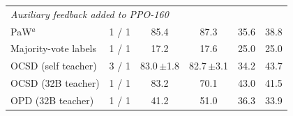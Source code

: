 \begin{tabular}{@{}l c c c c c@{}}
\midrule
\multicolumn{6}{l}{\emph{Auxiliary feedback added to PPO-160}} \\
PaW$^{a}$ & 1 / 1 & 85.4 & 87.3 & 35.6\rlap{\sigup{}} & 38.8\rlap{\sigup{}} \\
Majority-vote labels & 1 / 1 & 17.2\rlap{\sigup{}} & 17.6\rlap{\sigup{}} & 25.0\rlap{\sigup{}} & 25.0\rlap{\sigup{}} \\
OCSD (self teacher) & 3 / 1 & 83.0\sigup{}\,{\scriptsize$\pm$1.8} & 82.7\sigup{}\,{\scriptsize$\pm$3.1} & 34.2\rlap{\sigup{}} & 43.7\rlap{\sigup{}} \\
OCSD (32B teacher) & 1 / 1 & 83.2 & 70.1\rlap{\sigup{}} & 43.0\rlap{\sigup{}} & 41.5\rlap{\sigup{}} \\
OPD (32B teacher) & 1 / 1 & 41.2\rlap{\sigup{}} & 51.0\rlap{\sigup{}} & 36.3\rlap{\sigup{}} & 33.9\rlap{\sigup{}} \\
\bottomrule
\end{tabular}

